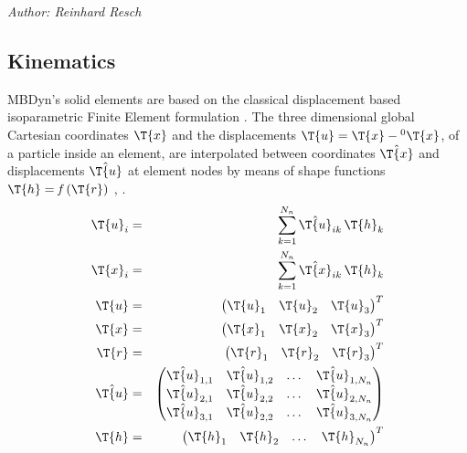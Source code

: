 %
%
%
%
%
%
%
%
\emph{Author: Reinhard Resch}
\subsection{Kinematics}
\label{sec:solid:interpol}
MBDyn's solid elements are based on the classical displacement based isoparametric Finite Element formulation \cite{BATHE2016}.
The three dimensional global Cartesian coordinates $\T{x}$ and the displacements $\T{u}=\T{x} - {^0}\T{x}$, of a particle inside an element,
are interpolated between coordinates $\hat{\T{x}}$ and displacements $\hat{\T{u}}$ at element nodes by means of shape functions $\T{h}=\mathit{f}\left(\T{r}\right)$ \cite{BATHE2016}, \cite{KUEBLER2005}.
\begin{eqnarray}
  \T{u}_{i} &=& \sum_{k=1}^{N_n}\hat{\T{u}}_{ik} \,\T{h}_{k} \label{eq:solid:u:interpol} \\
  \T{x}_{i} &=& \sum_{k=1}^{N_n}\hat{\T{x}}_{ik} \,\T{h}_{k} \\
  \T{u} &=& \begin{pmatrix} \T{u}_1 & \T{u}_2 & \T{u}_3 \end{pmatrix}^T \\
  \T{x} &=& \begin{pmatrix} \T{x}_1 & \T{x}_2 & \T{x}_3 \end{pmatrix}^T \\
  \T{r} &=& \begin{pmatrix} \T{r}_1 & \T{r}_2 & \T{r}_3 \end{pmatrix}^T \\
  \hat{\T{u}} &=& \begin{pmatrix}
    \hat{\T{u}}_{1,1} & \hat{\T{u}}_{1,2} & \ldots{} & \hat{\T{u}}_{1,N_n} \\
    \hat{\T{u}}_{2,1} & \hat{\T{u}}_{2,2} & \ldots{} & \hat{\T{u}}_{2,N_n} \\
    \hat{\T{u}}_{3,1} & \hat{\T{u}}_{2,2} & \ldots{} & \hat{\T{u}}_{3,N_n}
  \end{pmatrix} \\
  \T{h} & = & \begin{pmatrix}
    \T{h}_1 & \T{h}_2 & \ldots{} & \T{h}_{N_n}
  \end{pmatrix}^T
\end{eqnarray}

